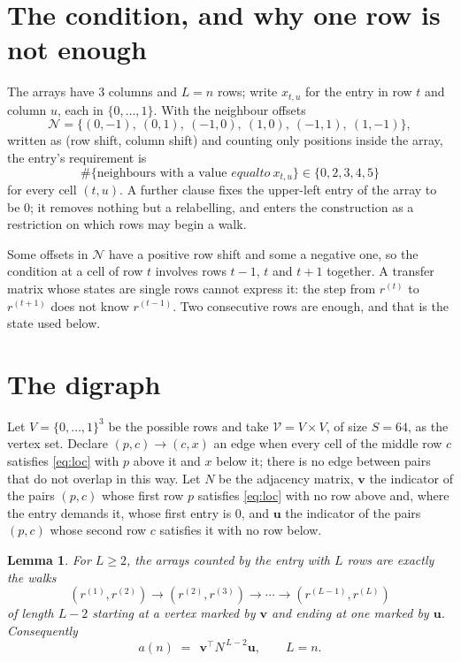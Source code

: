 \documentclass[11pt,a4paper]{article}
\theoremstyle{plain}
\newtheorem{lemma}[theorem]{Lemma}
\theoremstyle{definition}
\begin{document}
\section{The condition, and why one row is not enough}

The arrays have $3$ columns and $L=n$ rows; write $x_{t,u}$ for the entry in
row $t$ and column $u$, each in $\{0,\dots,1\}$. With the neighbour offsets
\[
\mathcal N=\{(0,-1),\ (0,1),\ (-1,0),\ (1,0),\ (-1,1),\ (1,-1)\},
\]
written as (row shift, column shift) and counting only positions inside the array, the
entry's requirement is
\begin{equation}\label{eq:loc}
\#\{\text{neighbours with a value }equal to\ x_{t,u}\}\in\{0,2,3,4,5\}
\end{equation}
for every cell $(t,u)$. A further clause fixes the upper-left entry of the array to be $0$; it removes nothing but a relabelling, and enters the construction as a restriction on which rows may begin a walk.

Some offsets in $\mathcal N$ have a positive row shift and some a negative one, so the
condition at a cell of row $t$ involves rows $t-1$, $t$ and $t+1$ together. A transfer
matrix whose states are single rows cannot express it: the step from $r^{(t)}$ to
$r^{(t+1)}$ does not know $r^{(t-1)}$. Two consecutive rows are enough, and that is
the state used below.

\section{The digraph}

Let $V=\{0,\dots,1\}^{3}$ be the possible rows and take
$\mathcal V=V\times V$, of size $S=64$, as the vertex set. Declare $(p,c)\to(c,x)$ an edge
when every cell of the middle row $c$ satisfies \eqref{eq:loc} with $p$ above it and $x$
below it; there is no edge between pairs that do not overlap in this way. Let $N$ be the
adjacency matrix, $\mathbf{v}$ the indicator of the pairs $(p,c)$ whose first row $p$
satisfies \eqref{eq:loc} with no row above and, where the entry demands it, whose first entry is $0$, and $\mathbf{u}$ the indicator of
the pairs $(p,c)$ whose second row $c$ satisfies it with no row below.

\begin{lemma}\label{lem:walk}
For $L\ge2$, the arrays counted by the entry with $L$ rows are exactly the walks
\[
(r^{(1)},r^{(2)})\to(r^{(2)},r^{(3)})\to\cdots\to(r^{(L-1)},r^{(L)})
\]
of length $L-2$ starting at a vertex marked by $\mathbf{v}$ and ending at one marked by
$\mathbf{u}$. Consequently
\[
a(n)\;=\;\,\mathbf{v}^{\!\top}N^{\,L-2}\mathbf{u},\qquad L=n .
\]
\end{lemma}
\end{document}
